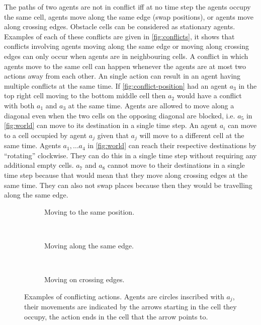The paths of two agents are not in conflict iff at no time step the agents
occupy the same cell, agents move along the same edge (swap positions), or
agents move along crossing edges. Obstacle cells can be considered as
stationary agents. Examples of each of these conflicts are given
in \autoref{fig:conflicts}, it shows that conflicts involving agents moving
along the same edge or moving along crossing edges can only occur when agents
are in neighbouring cells. A conflict in which agents move to the same cell can
happen whenever the agents are at most two actions away from each other. An
single action can result in an agent having multiple conflicts at the same
time. If \autoref{fig:conflict-position} had an agent $a_3$ in the top right
cell moving to the bottom middle cell then $a_2$ would have a conflict with
both $a_1$ and $a_3$ at the same time.
Agents are allowed to move along a diagonal even when the two cells on the
opposing diagonal are blocked, i.e. $a_5$ in \autoref{fig:world} can move to its
destination in a single time step. An agent $a_i$ can move to a cell occupied by
agent $a_j$ given that $a_j$ will move to a different cell at the same time.
Agents $a_1, \ldots a_4$ in \autoref{fig:world} can reach their respective
destinations
by ``rotating'' clockwise. They can do this in a single time step without
requiring any additional empty cells. $a_7$ and $a_8$ cannot move to their
destinations in a single time step because that would mean that they move along
crossing edges at the same time. They can also not swap places because then
they would be travelling along the same edge.

\begin{figure}[t]
	\centering
	\begin{subfigure}[b]{.3\textwidth}
		\centering
	    \def\svgscale{.7}
		
		\caption{Moving to the same position.}
		\label{fig:conflict-position}
	\end{subfigure}
	~
	\begin{subfigure}[b]{.3\textwidth}
		\centering
	    \def\svgscale{.7}
		
		\caption{Moving along the same edge.}
		\label{fig:conflict-same}
	\end{subfigure}
	~
	\begin{subfigure}[b]{.3\textwidth}
		\centering
  \def\svgscale{.7}
		
		\caption{Moving on crossing edges.}
		\label{fig:conflict-crossing}
	\end{subfigure}
	\caption{Examples of conflicting actions. Agents are circles inscribed with
	$a_j$, their movements are indicated by the arrows starting in the cell
	they occupy, the action ends in the cell that the arrow points to.}
	\label{fig:conflicts}
\end{figure}